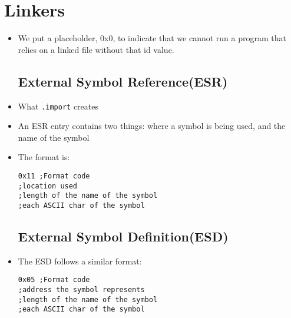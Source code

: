 \documentclass[12pt]{article}
\begin{document}
\section{Linkers}
\begin{itemize}
    \item We put a placeholder, 0x0, to indicate that we cannot run a program that relies on a linked file without that id value.
    \subsection{External Symbol Reference(ESR)}
        \item What \lstinline[mathescape]{.import} creates
        \item An ESR entry contains two things: where a symbol is being used, and the name of the symbol
        \item The format is:
\begin{lstlisting}[mathescape, numbers=none, breaklines=true]
0x11 ;Format code
;location used
;length of the name of the symbol
;each ASCII char of the symbol
\end{lstlisting}

    \subsection{External Symbol Definition(ESD)}
        \item The ESD follows a similar format:
\begin{lstlisting}[mathescape, numbers=none, breaklines=true]
0x05 ;Format code
;address the symbol represents
;length of the name of the symbol
;each ASCII char of the symbol
\end{lstlisting}

\end{itemize}
\end{document}
